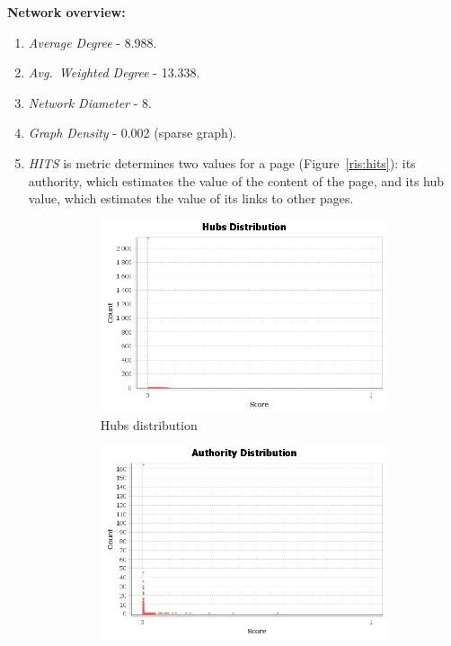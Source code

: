 \textbf{Network overview:}
\begin{enumerate}
    \item \textit{Average Degree} - 8.988.
    \item \textit{Avg.\ Weighted Degree} - 13.338.
    \item \textit{Network Diameter} - 8.
    \item \textit{Graph Density} - 0.002 (sparse graph).
    \item \textit{HITS} is metric determines two values for a page (Figure~\ref{ris:hits}): its authority, which estimates the value of the content of the page, and its hub value, which estimates the value of its links to other pages.
        \begin{figure}[H]
            \centering
            \begin{subfigure}{0.49\textwidth}
                \centering
                \includegraphics[width=\textwidth]{img/hits_hubs.png}
                \caption{Hubs distribution}
            \end{subfigure}
            \begin{subfigure}{0.49\textwidth}
                \centering
                \includegraphics[width=\textwidth]{img/hits_authority.png}

\end{subfigure}
\end{figure}
\end{enumerate}
